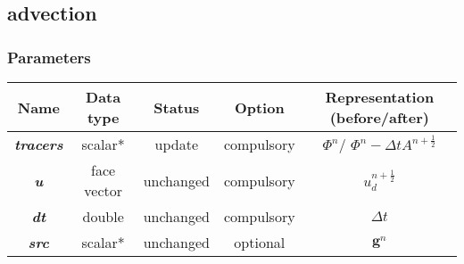 \documentclass[a4paper]{article}
\newcommand{\func}[1]{\textbf{\textcolor{function}{#1}}}
\newcommand{\para}[1]{\textbf{\emph{\textcolor{para}{#1}}}}
\begin{document}
\subsection{\func{advection}}

\subsubsection{Parameters}
\begin{center}
  \begin{tabular}{|c|c|c|c|c|}
    \hline
    Name & Data type & Status & Option & Representation (before/after)\\[0.5ex]
    \hline\hline
    \rowcolor{output} \para{tracers} & scalar* & update & compulsory & $\Phi^n$/ $\Phi^n-\Delta t A^{n+ \frac{1}{2}}$\\
    \hline
    \para{u} & face vector & unchanged & compulsory & $u_d^{n+ \frac{1}{2}}$\\
    \hline
    \para{dt} & double & unchanged & compulsory & $\Delta t$\\
    \hline
    \para{src} & scalar* & unchanged & optional & $ \mathbf{g}^n$ \\
    \hline
  \end{tabular}
\end{center}
\end{document}
